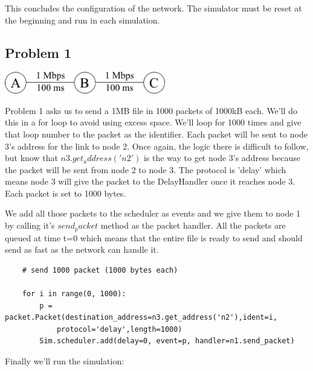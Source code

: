 \documentclass[11pt]{article}
\begin{document}
\vspace{5mm}

This concludes the configuration of the network. The simulator must be reset at the beginning and run in each simulation.

\subsection{Problem 1}

\vspace{5mm}

\includegraphics[width=7cm]{images/two-hop-1.png}

\vspace{5mm}

Problem 1 asks us to send a 1MB file in 1000 packets of 1000kB each. We'll do this in a for loop to avoid using excess space. We'll loop for 1000 times and give that loop number to the packet as the identifier. Each packet will be sent to node 3's address for the link to node 2. Once again, the logic there is difficult to follow, but know that \(n3.get_address('n2')\) is the way to get node 3's address because the packet will be sent from node 2 to node 3. The protocol is 'delay' which means node 3 will give the packet to the DelayHandler once it reaches node 3. Each packet is set to 1000 bytes.

We add all those packets to the scheduler as events and we give them to node 1 by calling it's \(send_packet\) method as the packet handler. All the packets are queued at time t=0 which means that the entire file is ready to send and should send as fast as the network can handle it.

\vspace{5mm}

\begin{lstlisting}
    # send 1000 packet (1000 bytes each)

    for i in range(0, 1000):
        p = packet.Packet(destination_address=n3.get_address('n2'),ident=i,
            protocol='delay',length=1000)
        Sim.scheduler.add(delay=0, event=p, handler=n1.send_packet)
\end{lstlisting}

\vspace{5mm}

Finally we'll run the simulation:
\end{document}
